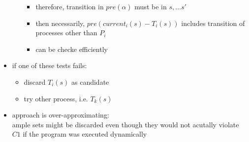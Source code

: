 \documentclass[a4paper, 10pt]{article}
\begin{document}
\begin{itemize}
\begin{enumerate}
\begin{itemize}
            \item therefore, transition in $pre(\alpha)$ must be in $s,\dots s'$
            \item then necessarily, $pre(current_i(s)-T_i(s))$ includes transition of processes other than $P_i$
            \item can be checke efficiently
        \end{itemize}
    \end{enumerate}
    \item if one of these tests fails:
    \begin{itemize}
        \item discard $T_i(s)$ as candidate
        \item try other process, i.e. $T_k(s)$
    \end{itemize}
    \item approach is over-approximating: \\
    ample sets might be discarded even though they would not acutally violate $C1$ if the program was executed dynamically
\end{itemize}
\end{document}
